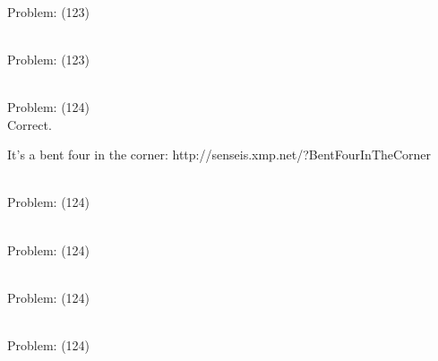 \documentclass[11pt]{article}
\begin{document}
\begin{minipage}[t]{0.5\textwidth}
  {\centering
  
\\
Problem: (123)\\
  }
\end{minipage}
\begin{minipage}[t]{0.5\textwidth}
  {\centering
  
\\
Problem: (123)\\
  }
\end{minipage}
\begin{minipage}[t]{0.5\textwidth}
  {\centering
  
\\
Problem: (124)\\
Correct.

It's a bent four in the corner: http://senseis.xmp.net/?BentFourInTheCorner\\
  }
\end{minipage}
\begin{minipage}[t]{0.5\textwidth}
  {\centering
  
\\
Problem: (124)\\
  }
\end{minipage}
\begin{minipage}[t]{0.5\textwidth}
  {\centering
  
\\
Problem: (124)\\
  }
\end{minipage}
\begin{minipage}[t]{0.5\textwidth}
  {\centering
  
\\
Problem: (124)\\
  }
\end{minipage}
\begin{minipage}[t]{0.5\textwidth}
  {\centering
  
\\
Problem: (124)\\
  }
\end{minipage}
\end{document}
